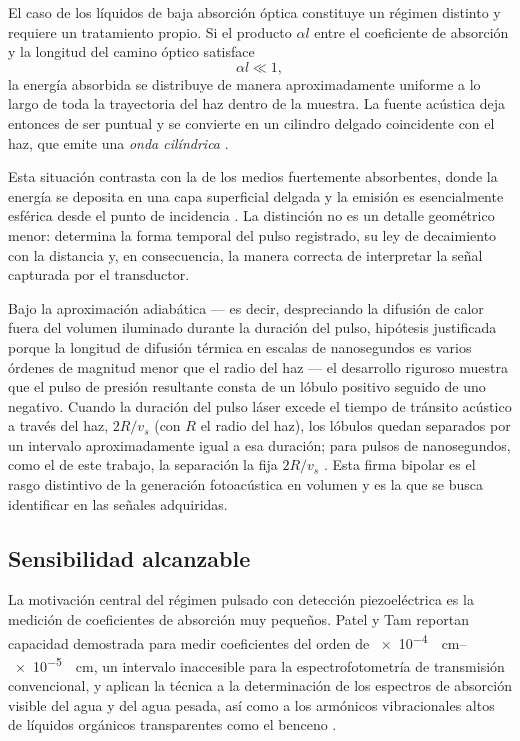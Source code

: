 El caso de los líquidos de baja absorción óptica constituye un
régimen distinto y requiere un tratamiento propio. Si el producto
$\alpha l$ entre el coeficiente de absorción y la longitud del
camino óptico satisface
\begin{equation}
    \alpha l \ll 1,
    \label{eq:condicion_debil}
\end{equation}
la energía absorbida se distribuye de manera aproximadamente
uniforme a lo largo de toda la trayectoria del haz dentro de la
muestra. La fuente acústica deja entonces de ser puntual y se
convierte en un cilindro delgado coincidente con el haz, que emite
una \textit{onda cilíndrica} \cite{PatelTam1981}.

Esta situación contrasta con la de los medios fuertemente
absorbentes, donde la energía se deposita en una capa superficial
delgada y la emisión es esencialmente esférica desde el punto de
incidencia \cite{PatelTam1981}. La distinción no es un detalle
geométrico menor: determina la forma temporal del pulso registrado,
su ley de decaimiento con la distancia y, en consecuencia, la
manera correcta de interpretar la señal capturada por el
transductor.

Bajo la aproximación adiabática --- es decir, despreciando la
difusión de calor fuera del volumen iluminado durante la duración
del pulso, hipótesis justificada porque la longitud de difusión
térmica en escalas de nanosegundos es varios órdenes de magnitud
menor que el radio del haz --- el desarrollo riguroso muestra que
el pulso de presión resultante consta de un lóbulo positivo seguido
de uno negativo. Cuando la duración del pulso láser excede el tiempo
de tránsito acústico a través del haz, $2R/v_s$ (con $R$ el radio del
haz), los lóbulos quedan
separados por un intervalo aproximadamente igual a esa duración; para
pulsos de nanosegundos, como el de este trabajo, la separación la fija
$2R/v_s$ \cite{PatelTam1981}. Esta firma bipolar
es el rasgo distintivo de la generación fotoacústica en volumen y
es la que se busca identificar en las señales adquiridas.

\subsection*{Sensibilidad alcanzable}

La motivación central del régimen pulsado con detección
piezoeléctrica es la medición de coeficientes de absorción muy
pequeños. Patel y Tam reportan capacidad demostrada para medir
coeficientes del orden de \SIrange{e-4}{e-5}{\per\centi\meter},
un intervalo inaccesible para la espectrofotometría de transmisión
convencional, y aplican la técnica a la determinación de los
espectros de absorción visible del agua y del agua pesada, así como
a los armónicos vibracionales altos de líquidos orgánicos
transparentes como el benceno \cite{PatelTam1981}.

